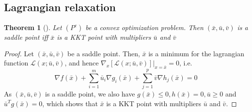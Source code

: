 \documentclass{book}
\theoremstyle{theoremv2}
\newtheorem{theorem}{Theorem}[chapter]
\theoremstyle{defv2}
\theoremstyle{remark}
\theoremstyle{remark}
\begin{document}
\subsection{Lagrangian relaxation}
\begin{theorem}[]
    Let $(P^c)$ be a convex optimization problem. Then $(\bar{x},\bar{u},\bar{v})$ is a saddle point iff $\bar{x}$ is a KKT point with multipliers $\bar{u}$ and $\bar{v}$
\end{theorem}
\begin{proof}
    Let $(\bar{x},\bar{u},\bar{v})$ be a saddle point. Then, $\bar{x}$ is a minimum for the lagrangian function $\mathcal{L}(x;\bar{u},\bar{v})$, and hence $\nabla_x [\mathcal{L}(x;\bar{u},\bar{v})]|_{x=\bar{x}}=0$, i.e.
    \[
        \nabla f(\bar{x})  + \displaystyle\sum_{i=1}^{m}\bar{u}_i\nabla g_i(\bar{x}) + \displaystyle\sum_{j=1}^{p}\bar{v}\nabla h_j(\bar{x})=0
    \]
    As $(\bar{x},\bar{u},\bar{v})$ is a saddle point, we also have $g(\bar{x})\leq0, h(\bar{x})=0,\bar{u}\geq 0$ and $\bar{u}^T g(\bar{x})=0$, which shows that $\bar{x}$ is a KKT point with multipliers $\bar{u}$ and $\bar{v}$. 


\end{proof}
\end{document}
